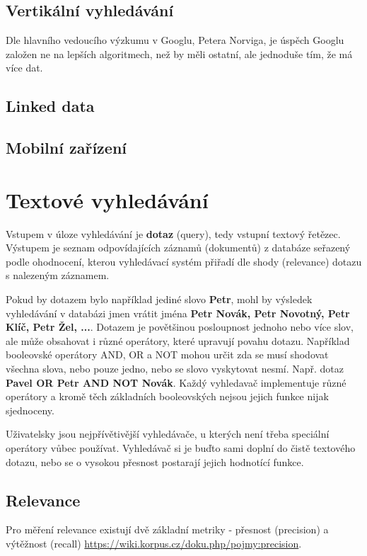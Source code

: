 \documentclass[11pt]{article}
\begin{document}
\subsection{Vertikální vyhledávání}
Dle hlavního vedoucího výzkumu v Googlu, Petera Norviga, je úspěch Googlu
založen ne na lepších algoritmech, než by měli ostatní, ale jednoduše tím, že
má více dat.
\subsection{Linked data}
\subsection{Mobilní zařízení}



\section{Textové vyhledávání}
Vstupem v úloze vyhledávání je \textbf{dotaz} (query), tedy vstupní textový
řetězec. Výstupem je seznam odpovídajících záznamů (dokumentů) z databáze
seřazený podle ohodnocení, kterou vyhledávací systém přiřadí dle shody
(relevance) dotazu s nalezeným záznamem.

Pokud by dotazem bylo například jediné slovo \textbf{Petr}, mohl by výsledek
vyhledávání v databázi jmen vrátit jména \textbf{Petr Novák, Petr Novotný, Petr
Klíč, Petr Žel, ...}. Dotazem je povětšinou posloupnost jednoho nebo více slov,
ale může obsahovat i různé operátory, které upravují povahu dotazu. Například
booleovské operátory AND, OR a NOT mohou určit zda se musí shodovat všechna
slova, nebo pouze jedno, nebo se slovo vyskytovat nesmí. Např. dotaz
\textbf{Pavel OR Petr AND NOT Novák}. Každý vyhledavač implementuje různé
operátory a kromě těch základních booleovských nejsou jejich funkce nijak
sjednoceny.

Uživatelsky jsou nejpřívětivější vyhledávače, u kterých není třeba speciální
operátory vůbec používat. Vyhledávač si je buďto sami doplní do čistě textového
dotazu, nebo se o vysokou přesnost postarají jejich hodnotící funkce.

\subsection{Relevance}
Pro měření relevance existují dvě základní metriky - přesnost (precision) a
výtěžnost (recall) \url{https://wiki.korpus.cz/doku.php/pojmy:precision}.
\end{document}
